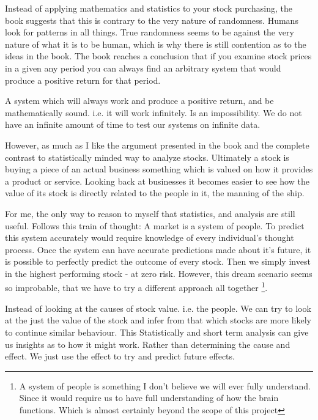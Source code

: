 \documentclass[11pt]{article}
\begin{document}
    Instead of applying mathematics and statistics to your stock purchasing, the book
    suggests that this is contrary to the 
    very nature of randomness. Humans look for patterns in all things. True 
    randomness seems to be against the very nature of what it is to be human, which is why
    there is still contention as to the ideas in the book. The book reaches a conclusion that
    if you examine stock prices in a given any period you can always find an arbitrary
    system that would produce a positive return for that period.

    A system which will always work and produce a positive return, and be mathematically sound.
    i.e. it will work infinitely. Is an impossibility. We do not have an infinite amount of
    time to test our systems on infinite data.

    However, as much as I like the argument presented in the book and the complete contrast to
    statistically minded way to analyze stocks. Ultimately a stock is buying a piece of an
    actual business something which is valued on how it provides a product or service.
    Looking back at businesses it becomes easier to see how the value of its stock is directly
    related to the people in it, the manning of the ship.

    For me, the only way to reason to myself that statistics, and analysis are still 
    useful. Follows this train of thought: A market is a system of people.
    To predict this system accurately would require knowledge of every individual's
    thought process. Once the system can have accurate predictions made about it's
    future, it is possible to perfectly predict the outcome of every stock. Then
    we simply invest in the highest performing stock - at zero risk. However, this
    dream scenario seems so improbable, that we have to try a different approach
    all together
    \footnote{A system of people is something I don't believe we will ever fully understand.
    Since it would require us to have full understanding of how the brain functions. Which
    is almost certainly beyond the scope of this project}.

    Instead of looking at the causes of stock value. i.e. the people. We can try to look
    at the just the value of the stock and infer from that which stocks are more
    likely to continue similar behaviour. This 
    Statistically and short term analysis can give us insights as to 
    how it might work. Rather than determining the cause and effect. We just use the effect
    to try and predict future effects.
\end{document}
